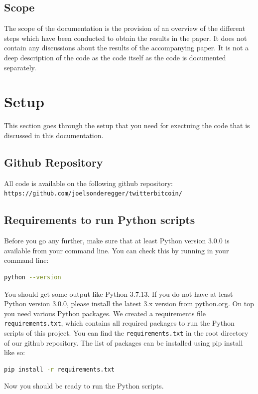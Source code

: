 \documentclass[a4paper,12pt]{article}
\begin{document}
\begin{spacing}{1.2}
\subsection{Scope}
The scope of the documentation is the provision of an overview of the different steps which have been conducted to obtain the results in the paper. It does not contain any discussions about the results of the accompanying paper. It is not a deep description of the code as the code itself as the code is documented separately. 
\clearpage

\section{Setup}
This section goes through the setup that you need for exectuing the code that is discussed in this documentation.
\subsection{Github Repository}
All code is available on the following github repository:
\newline
\verb|https://github.com/joelsonderegger/twitterbitcoin/|
\subsection{Requirements to run Python scripts}
Before you go any further, make sure that at least Python version 3.0.0 is available from your command line. You can check this by running in your command line:
\begin{lstlisting}[language=bash]
    python --version
\end{lstlisting}

You should get some output like Python 3.7.13. If you do not have at least Python version 3.0.0, please install the latest 3.x version from python.org.
\newline \newline
On top you need various Python packages. We created a  requirements file \verb|requirements.txt|, which contains all required packages to run the Python scripts of this project. You can find the  \verb|requirements.txt| in the root directory of our github repository. The list of packages can be installed using pip install like so:

\begin{lstlisting}[language=bash]
    pip install -r requirements.txt
\end{lstlisting}
Now you should be ready to run the Python scripts.


\end{spacing}
\end{document}
